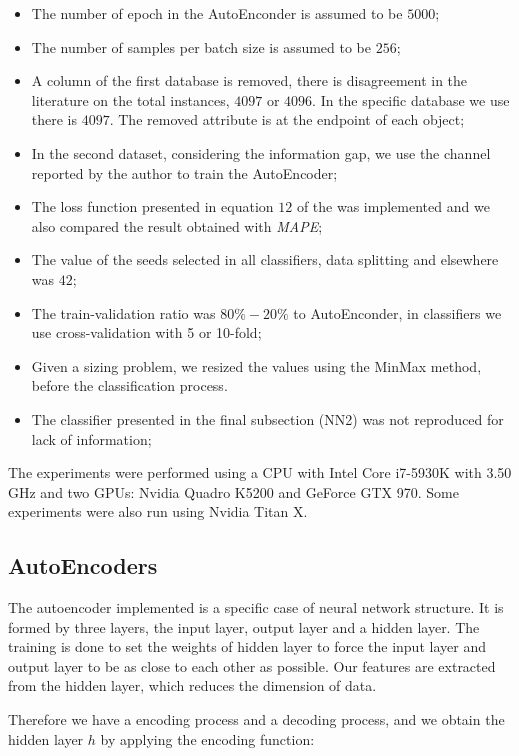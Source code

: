 \begin{itemize}
\item The number of epoch in the AutoEnconder is assumed to be $5000$; 
\item The number of samples per batch size is assumed to be $256$; 
\item A column of the first database is removed, there is disagreement in the literature on the total instances, $4097$ or $4096$. In the specific database we use there is $4097$. The removed attribute is at the endpoint of each object; 
\item In the second dataset, considering the information gap, we use the channel reported by the author to train the AutoEncoder;
\item The loss function presented in equation $12$ of the \cite{WenZha:2018} was implemented and we also compared the result obtained with \textit{MAPE}; 
\item The value of the seeds selected in all classifiers, data splitting and elsewhere was $42$; 
\item The train-validation ratio was $80\%-20\%$ to AutoEnconder, in classifiers we use cross-validation with 5 or 10-fold; 
\item Given a sizing problem, we resized the values using the MinMax method, before the classification process.
\item The classifier presented in the final subsection (NN2) was not reproduced for lack of information; 
\end{itemize}

The experiments were performed using a CPU with Intel Core i7-5930K with 3.50 GHz and two GPUs: Nvidia Quadro K5200 and GeForce GTX 970. Some experiments were also run using Nvidia Titan X.

\subsection{AutoEncoders}

The autoencoder implemented is a specific case of neural network structure. It is formed by three layers, the input layer, output layer and a hidden layer. The training is done to set the weights of hidden layer to force the input layer and output layer to be as close to each other as possible. Our features are extracted from the hidden layer, which reduces the dimension of data.

Therefore we have a	encoding process and a decoding process, and we obtain the hidden layer $h$ by applying the encoding function:

